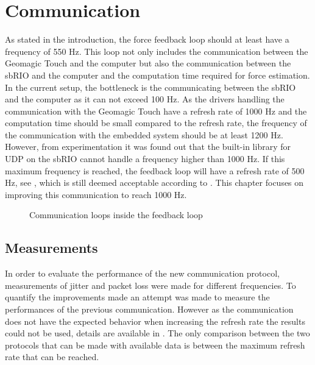 \chapter{Communication}\label{cha:communication}

As stated in the introduction, the force feedback loop should at least have a frequency of 550 Hz. This loop not only includes the communication between the Geomagic Touch and the computer but also the communication between the sbRIO and the computer and the computation time required for force estimation. In the current setup, the bottleneck is the communicating between the sbRIO and the computer as it can not exceed 100 Hz. As the drivers handling the communication with the Geomagic Touch have a refresh rate of 1000 Hz and the computation time should be small compared to the refresh rate, the frequency of the communication with the embedded system should be at least 1200 Hz. However, from experimentation it was found out that the built-in library for UDP on the sbRIO cannot handle a frequency higher than 1000 Hz. If this maximum frequency is reached, the feedback loop will have a refresh rate of 500 Hz, see , which is still deemed acceptable according to \cite{coles2011role}.  This chapter focuses on improving this communication to reach 1000 Hz.

\begin{figure}[H]
	\centering
	
	\caption{Communication loops inside the feedback loop}
	\label{fig:speed_graph}
\end{figure}











\section{Measurements}

In order to evaluate the performance of the new communication protocol, measurements of jitter and packet loss were made for different frequencies. To quantify the improvements made an attempt was made to measure the performances of the previous communication. However as the communication does not have the expected behavior when increasing the refresh rate the results could not be used, details are available in . The only comparison between the two protocols that can be made with available data is between the maximum refresh rate that can be reached.

